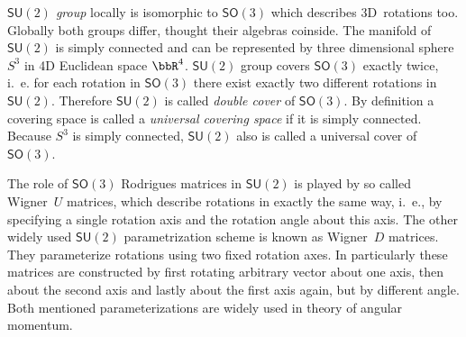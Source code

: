 %
\begin{example}\textit{$\mathsf{SU}(2)$ group} \label{SU2group}locally is isomorphic
to $\mathsf{SO}(3)$ which describes 3D~rotations too. Globally
both groups differ, thought their algebras coinside. The
manifold of $\mathsf{SU}(2)$ is simply connected and can be
represented by three dimensional sphere $S^3$ in 4D Euclidean
space $\bbR^4$. $\mathsf{SU}(2)$ group covers $\mathsf{SO}(3)$
exactly twice, i.~e. for each rotation in $\mathsf{SO}(3)$ there
exist exactly two different rotations in $\mathsf{SU}(2)$.
Therefore $\mathsf{SU}(2)$ is called \textit{double cover} of
$\mathsf{SO}(3)$. By definition a covering space is called a
\textit{universal covering space} if it is simply connected.
Because $S^3$ is simply connected, $\mathsf{SU}(2)$ also is called
a universal cover of $\mathsf{SO}(3)$.


The role of $\mathsf{SO}(3)$ Rodrigues matrices in
$\mathsf{SU}(2)$ is played by so called Wigner~$U$ matrices, which
describe rotations in exactly the same way, i.~e., by specifying a
single rotation axis and the rotation angle about this axis. The
other widely used $\mathsf{SU}(2)$ parametrization scheme is known
as Wigner~$D$ matrices. They parameterize rotations using two
fixed rotation axes. In particularly these matrices are
constructed by first rotating arbitrary vector about one axis,
then about the second axis and lastly about the first axis again, but by different angle.
Both mentioned parameterizations are widely used in theory of
angular momentum.


\end{example}

